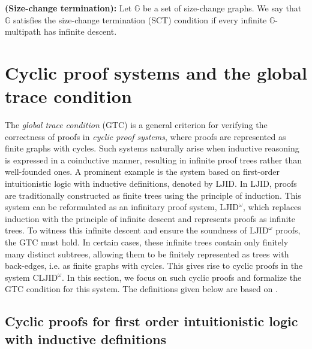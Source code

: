 \documentclass{article}
\begin{document}
\begin{definition}
    \textbf{(Size-change termination):} Let $\mathbb{G}$ be a set of size-change graphs. We say that $\mathbb{G}$ satisfies the size-change termination (SCT) condition if every infinite $\mathbb{G}$-multipath has infinite descent.
\end{definition}






\section{Cyclic proof systems and the global trace condition}

The \emph{global trace condition} (GTC) is a general criterion for verifying the correctness of proofs in \emph{cyclic proof systems}, where proofs are represented as finite graphs with cycles. Such systems naturally arise when inductive reasoning is expressed in a coinductive manner, resulting in infinite proof trees rather than well-founded ones. A prominent example is the system based on first-order intuitionistic logic with inductive definitions, denoted by $\text{LJID}$. In $\text{LJID}$, proofs are traditionally constructed as finite trees using the principle of induction. This system can be reformulated as an infinitary proof system, $\text{LJID}^{\omega}$, which replaces induction with the principle of infinite descent and represents proofs as infinite trees. To witness this infinite descent and ensure the soundness of $\text{LJID}^{\omega}$ proofs, the GTC must hold. In certain cases, these infinite trees contain only finitely many distinct subtrees, allowing them to be finitely represented as trees with back-edges, i.e. 
as finite graphs with cycles. This gives rise to cyclic proofs in the system $\text{CLJID}^{\omega}$. In this section, we focus on such cyclic proofs and formalize the GTC condition for this system. The definitions given below are based on \cite{Brotherston1,Brotherston2,BrotherstonSimpson,Berardi,Mirai}.

\subsection{Cyclic proofs for first order intuitionistic logic with inductive definitions}
\end{document}
